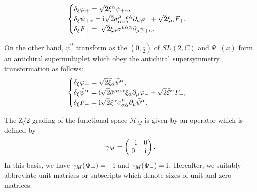 \documentclass{ptephy}%
\newcommand{\A}{\alpha}
\begin{document}
\begin{equation}
\begin{cases}
\delta_\xi\varphi_+ =\sqrt{2}\xi^\alpha \psi_{+\alpha}, \\
\delta_\xi\psi_{+\alpha} = {\rm i}\sqrt{2}\sigma^\mu_{\alpha\dot{\alpha}}\bar{\xi}^{\dot{\alpha}}\partial_\mu\varphi_+
+\sqrt{2}\xi_\alpha F_+,\\
\delta_\xi F_+ = {\rm i}\sqrt{2}\bar{\xi}_{\dot{\alpha}}\bar{\sigma}^{\mu\dot{\alpha}\alpha}\partial_\mu\psi_{+\alpha}.
\end{cases} \label{deltaxi}
\end{equation}

On the other hand, $\bar{\psi}^{\dot{\A}}$ transform as 
the $(0,\frac{1}{2})$ of $SL(2,C)$ and $\Psi_-(x)$ form an
 antichiral supermultiplet which obey the 
antichiral supersymmetry transformation as follows:
\begin{equation}
\begin{cases}
\delta_\xi\varphi_- = \sqrt{2}\bar{\xi}_{\dot{\alpha}}\bar{\psi}^{\dot{\alpha}}_-, \\
\delta_\xi\bar{\psi}_-^{\dot{\alpha}} = {\rm i}\sqrt{2}\bar{\sigma}^{\mu\dot{\alpha}\alpha}\xi_\alpha\partial_\mu\varphi_-
+\sqrt{2}\bar{\xi}^{\dot{\alpha}}F_-, \\
\delta_\xi F_- = {\rm i}\sqrt{2}\xi^\alpha\sigma^\mu_{\alpha\dot{\alpha}}\partial_\mu\bar{\psi}_-^{\dot{\alpha}}. 
\end{cases} \label{deltabxi}
\end{equation}

The Z/2 grading of the functional space $\mathcal{H}_M$ is given by an operator which is 
defined by
\begin{equation}
\gamma_M =\begin{pmatrix}
-{\rm i} & 0\\
0 & {\rm i}
\end{pmatrix}.
\end{equation}
In this basis, we have $\gamma_M(\Psi_+)=-{\rm i}$ and $\gamma_M(\Psi_-)={\rm i}$. 
Hereafter, we suitably abbreviate unit matrices or subscripts which denote sizes of unit and zero matrices. 
\end{document}
